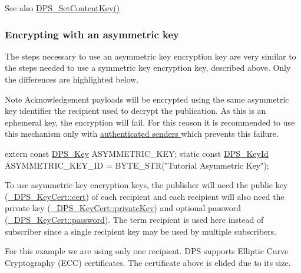 \begin{DoxySeeAlso}{See also}
\hyperlink{group__keystore_ga1855a8efae53b90fa95aa5b97295c4ec}{D\+P\+S\+\_\+\+Set\+Content\+Key()}
\end{DoxySeeAlso}
\hypertarget{tutorials-security_encrypting-with-an-asymmetric-key}{}\subsubsection{Encrypting with an asymmetric key}\label{tutorials-security_encrypting-with-an-asymmetric-key}
The steps necessary to use an asymmetric key encryption key are very similar to the steps needed to use a symmetric key encryption key, described above. Only the differences are highlighted below.

\begin{DoxyNote}{Note}
Acknowledgement payloads will be encrypted using the same asymmetric key identifier the recipient used to decrypt the publication. As this is an ephemeral key, the encryption will fail. For this reason it is recommended to use this mechanism only with \hyperlink{tutorials-security_authenticating-the-message-sender}{authenticated senders } which prevents this failure.
\end{DoxyNote}

\begin{DoxyCodeInclude}
\textcolor{keyword}{extern} \textcolor{keyword}{const} \hyperlink{struct___d_p_s___key}{DPS\_Key} ASYMMETRIC\_KEY;
\textcolor{keyword}{static} \textcolor{keyword}{const} \hyperlink{struct___d_p_s___key_id}{DPS\_KeyId} ASYMMETRIC\_KEY\_ID = BYTE\_STR(\textcolor{stringliteral}{"Tutorial Asymmetric Key"});
\end{DoxyCodeInclude}
To use asymmetric key encryption keys, the publisher will need the public key (\hyperlink{struct___d_p_s___key_cert_a2783654ef73f2cc58911f40cd6e4f6ba}{\+\_\+\+D\+P\+S\+\_\+\+Key\+Cert\+::cert}) of each recipient and each recipient will also need the private key (\hyperlink{struct___d_p_s___key_cert_a0ba1842f3982c930ba76469349b0812d}{\+\_\+\+D\+P\+S\+\_\+\+Key\+Cert\+::private\+Key}) and optional password (\hyperlink{struct___d_p_s___key_cert_a18f3f492b66fbeb3de6a09aff54369cf}{\+\_\+\+D\+P\+S\+\_\+\+Key\+Cert\+::password}). The term recipient is used here instead of subscriber since a single recipient key may be used by multiple subscribers.

For this example we are using only one recipient. D\+PS supports Elliptic Curve Cryptography (E\+CC) certificates. The certificate above is elided due to its size.


